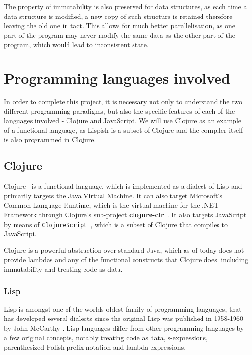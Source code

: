 The property of immutability is also preserved for data structures, as each time a data structure is modified, a new copy of such structure is retained therefore leaving the old one in tact. This allows for much better parallelisation, as one part of the program may never modify the same data as the other part of the program, which would lead to inconsistent state.

\section{Programming languages involved}
In order to complete this project, it is necessary not only to understand the two different programming paradigms, but also the specific features of each of the languages involved - Clojure and JavaScript.
We will use Clojure as an example of a functional language, as Lispish is a subset of Clojure and the compiler itself is also programmed in Clojure.

\subsection{Clojure}
Clojure~\cite{Clojure:2013:Site} is a functional language, which is implemented as a dialect of Lisp and primarily targets the Java Virtual Machine. It can also target Microsoft's Common Language Runtime, which is the virtual machine for the .NET Framework through Clojure's sub-project \textbf{clojure-clr}~\cite{clojure-clr}. 
It also targets JavaScript by means of \texttt{ClojureScript}~\cite{ClojureScript:2013:Site}, which is a subset of Clojure that compiles to JavaScript. 

Clojure is a powerful abstraction over standard Java, which as of today does not provide lambdas and any of the functional constructs that Clojure does, including immutability and treating code as data.

\subsubsection{Lisp}

Lisp is amongst one of the worlds oldest family of programming languages, that has developed several dialects since the original Lisp was published in 1958-1960 by John McCarthy \cite{lisp-mccarthy}.
Lisp languages differ from other programming languages by a few original concepts, notably treating code as data, s-expressions, parenthesized Polish prefix notation and lambda expressions.

